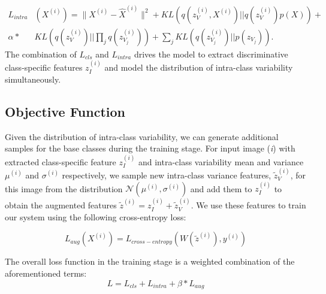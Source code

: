 \documentclass[10pt,twocolumn,letterpaper]{article}
\begin{document}
    \footnotesize
      \begin{equation}
      \begin{split} \label{intra-class-3}
        L_{intra}&(X^{(i)}) 
       = \| X^{(i)} - \hat{X}^{(i)} \|^2 + KL\left( q(z_V^{(i)},X^{(i)})||q(z_V^{(i)})p(X) \right) + \\ \alpha*& KL\left( q(z_V^{(i)})||\prod_{j}q(z_{V_j}^{(i)}) \right) + \sum_{j}KL\left(q(z_{V_j}^{(i)})||p(z_{V_j})\right). 
      \end{split}
    \end{equation}
     \normalsize 
     \noindent The combination of $L_{cls}$ and $L_{intra}$ drives the model to extract discriminative class-specific features
    $z_I^{(i)}$ and model the distribution of intra-class variability simultaneously.


\subsection{Objective Function}
        Given the distribution of intra-class variability, we can generate additional samples for the base classes during the training stage. For input image (\textit{i}) with extracted class-specific feature $z_I^{(i)}$ and  intra-class variability mean and variance $\mu^{(i)}$ and $\sigma^{(i)}$ respectively, we sample new intra-class variance features, $\tilde{z}_V^{(i)}$,   for this image from the distribution $\mathcal{N}(\mu^{(i)}, \sigma^{(i)})$ and add them to $z_I^{(i)}$ to obtain the augmented features $\tilde{z}^{(i)} = z_{I}^{(i)} + \tilde{z}_V^{(i)}$.
We use these features to train our system using the following cross-entropy loss:
\begin{comment}
        \begin{equation}
        L_{aug}(X_i) = - \textnormal{log} \frac{\textnormal{exp}(W_{y_i}^T*\tilde{z}_{I_i})}{\sum_{j}^K\textnormal{exp}(W_j^T*\tilde{z_{I_i}})},
      \end{equation} 
\end{comment}    
\begin{equation}
        L_{aug}(X^{(i)}) = L_{cross-entropy}\left(W(\tilde{z}^{(i)}), y^{(i)}\right)
\end{equation} 


  
      The overall loss function in the training stage is a weighted combination of the aforementioned terms:
      \begin{equation} \label{loss_function}
          L = L_{cls} + L_{intra} + \beta * L_{aug}
      \end{equation}
      
\end{document}
